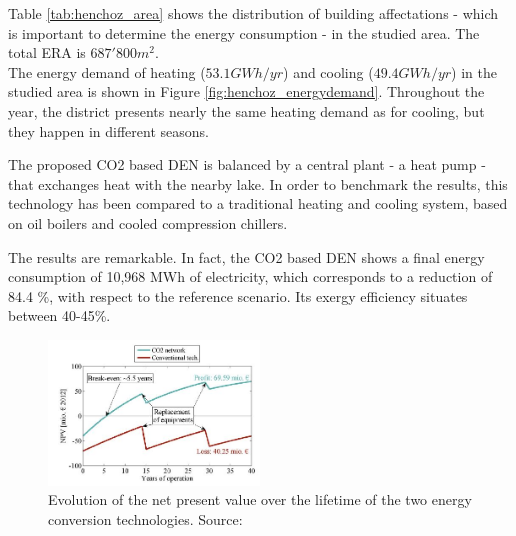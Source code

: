 \documentclass{article}
\begin{document}

Table \ref{tab:henchoz_area} shows the distribution of building affectations - which is important to determine the energy consumption - in the studied area. The total ERA is $687'800 m^{2}$.\\



The energy demand of heating ($53.1 GWh/yr$) and cooling ($49.4 GWh/yr$) in the studied area is shown in Figure \ref{fig:henchoz_energydemand}. Throughout the year, the district presents nearly the same heating demand as for cooling, but they happen in different seasons. 


The proposed CO2 based DEN is balanced by a central plant - a heat pump - that exchanges heat with the nearby lake. In order to benchmark the results, this technology has been compared to a traditional heating and cooling system, based on oil boilers and cooled compression chillers.

The results are remarkable. In fact, the CO2 based DEN shows a final energy consumption of 10,968 MWh of electricity, which corresponds to a reduction of 84.4 \%, with respect to the reference scenario. Its exergy efficiency situates between 40-45\%.


\begin{figure}[h!]
\centering
\includegraphics[width=0.5\textwidth]{henchoz_costs.JPG}
\caption{Evolution of the net present value over the lifetime of the two energy conversion technologies. Source: \cite{henchozPotentialRefrigerantBased}}
\label{fig:henchoz_costs}
\end{figure}
\end{document}
